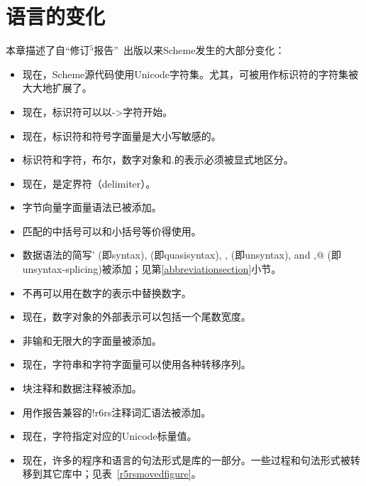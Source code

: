 \chapter{语言的变化}
\label{languagechangesappendix}

本章描述了自“修订$^5$报告”~\cite{R5RS}出版以来Scheme发生的大部分变化：

\begin{itemize}
\item 现在，Scheme源代码使用Unicode字符集。尤其，可被用作标识符的字符集被大大地扩展了。
\item 现在，标识符可以以{\cf ->}字符开始。
\item 现在，标识符和符号字面量是大小写敏感的。
\item 标识符和字符，布尔，数字对象和{\cf .}的表示必须被显式地区分。
\item 现在，{\cf \sharpsign}是定界符（delimiter）。
\item 字节向量字面量语法已被添加。
\item 匹配的中括号可以和小括号等价得使用。
\item 数据语法的简写{\cf \sharpsign{}'} (即{\cf syntax}), {\cf \sharpsign\backquote} (即{\cf quasisyntax}), {\cf \sharpsign{},} (即{\cf unsyntax}), and {\cf \sharpsign{},@} (即{\cf unsyntax-splicing})被添加；见第\ref{abbreviationsection}小节。
\item {\cf \sharpsign}不再可以用在数字的表示中替换数字。
\item 现在，数字对象的外部表示可以包括一个尾数宽度。
\item 非输和无限大的字面量被添加。
\item 现在，字符串和字符字面量可以使用各种转移序列。
\item 块注释和数据注释被添加。
\item 用作报告兼容的{\cf \sharpsign{}!r6rs}注释词汇语法被添加。
\item 现在，字符指定对应的Unicode标量值。
\item 现在，许多的程序和语言的句法形式是库的一部分。一些过程和句法形式被转移到其它库中；见表~\ref{r5rsmovedfigure}。


\end{itemize}
